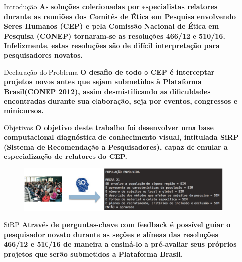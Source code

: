 \documentclass[final]{beamer}
\newlength{\sepmargin}
\newlength{\onecolwid}
\begin{document}
\begin{frame}[t]
\begin{columns}[t]
\begin{column}{\sepmargin}\end{column}
\begin{column}{\onecolwid} %
\vspace{1em}
  \begin{block}{Introdução}
\textbf{As soluções colecionadas por especialistas relatores durante as reuniões dos Comitês de Ética em Pesquisa envolvendo Seres Humanos (CEP) e pela Comissão Nacional de Ética em Pesquisa (CONEP) tornaram-se as resoluções 466/12 e 510/16. Infelizmente, estas resoluções são de difícil interpretação para pesquisadores novatos.}
\end{block}

\begin{block}{Declaração do Problema}
\textbf{O desafio de todo o CEP é interceptar projetos novos antes que sejam submetidos à Plataforma Brasil(CONEP 2012), assim desmistificando as dificuldades encontradas durante sua elaboração, seja por eventos, congressos e minicursos.}
\end{block}

\begin{block}{Objetivos}
\textbf{O objetivo deste trabalho foi desenvolver uma base computacional diagnóstica de conhecimento visual, intitulada SiRP (Sistema de Recomendação a Pesquisadores), capaz de emular a especialização de relatores do CEP.}

\begin{figure}
\vspace*{1cm}
\includegraphics[width=\linewidth]{intro.png}
\end{figure}
\end{block}

\begin{block}{SiRP}
\textbf{Através de perguntas-chave com feedback é possível guiar o pesquisador novato durante as seções e alíneas das resoluções 466/12 e 510/16 de maneira a ensiná-lo a pré-avaliar seus próprios projetos que serão submetidos a Plataforma Brasil.}


\end{block}
\end{column}
\end{columns}
\end{frame}
\end{document}
